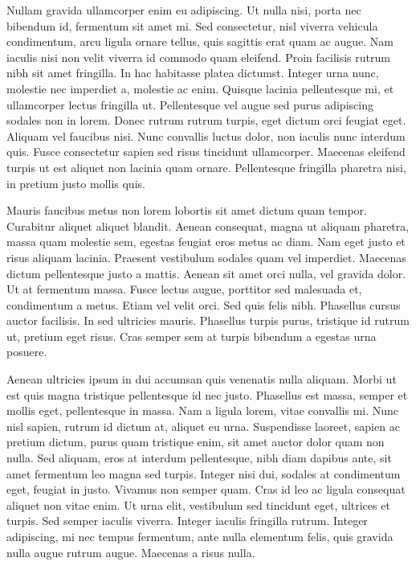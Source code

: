 \documentclass[a4paper]{article}
\begin{document}
Nullam gravida ullamcorper enim eu adipiscing. Ut nulla nisi, porta nec bibendum id, fermentum sit amet mi. Sed consectetur, nisl viverra vehicula condimentum, arcu ligula ornare tellus, quis sagittis erat quam ac augue. Nam iaculis nisi non velit viverra id commodo quam eleifend. Proin facilisis rutrum nibh sit amet fringilla. In hac habitasse platea dictumst. Integer urna nunc, molestie nec imperdiet a, molestie ac enim. Quisque lacinia pellentesque mi, et ullamcorper lectus fringilla ut. Pellentesque vel augue sed purus adipiscing sodales non in lorem. Donec rutrum rutrum turpis, eget dictum orci feugiat eget. Aliquam vel faucibus nisi. Nunc convallis luctus dolor, non iaculis nunc interdum quis. Fusce consectetur sapien sed risus tincidunt ullamcorper. Maecenas eleifend turpis ut est aliquet non lacinia quam ornare. Pellentesque fringilla pharetra nisi, in pretium justo mollis quis.

Mauris faucibus metus non lorem lobortis sit amet dictum quam tempor. Curabitur aliquet aliquet blandit. Aenean consequat, magna ut aliquam pharetra, massa quam molestie sem, egestas feugiat eros metus ac diam. Nam eget justo et risus aliquam lacinia. Praesent vestibulum sodales quam vel imperdiet. Maecenas dictum pellentesque justo a mattis. Aenean sit amet orci nulla, vel gravida dolor. Ut at fermentum massa. Fusce lectus augue, porttitor sed malesuada et, condimentum a metus. Etiam vel velit orci. Sed quis felis nibh. Phasellus cursus auctor facilisis. In sed ultricies mauris. Phasellus turpis purus, tristique id rutrum ut, pretium eget risus. Cras semper sem at turpis bibendum a egestas urna posuere.

Aenean ultricies ipsum in dui accumsan quis venenatis nulla aliquam. Morbi ut est quis magna tristique pellentesque id nec justo. Phasellus est massa, semper et mollis eget, pellentesque in massa. Nam a ligula lorem, vitae convallis mi. Nunc nisl sapien, rutrum id dictum at, aliquet eu urna. Suspendisse laoreet, sapien ac pretium dictum, purus quam tristique enim, sit amet auctor dolor quam non nulla. Sed aliquam, eros at interdum pellentesque, nibh diam dapibus ante, sit amet fermentum leo magna sed turpis. Integer nisi dui, sodales at condimentum eget, feugiat in justo. Vivamus non semper quam. Cras id leo ac ligula consequat aliquet non vitae enim. Ut urna elit, vestibulum sed tincidunt eget, ultrices et turpis. Sed semper iaculis viverra. Integer iaculis fringilla rutrum. Integer adipiscing, mi nec tempus fermentum, ante nulla elementum felis, quis gravida nulla augue rutrum augue. Maecenas a risus nulla.
\end{document}
